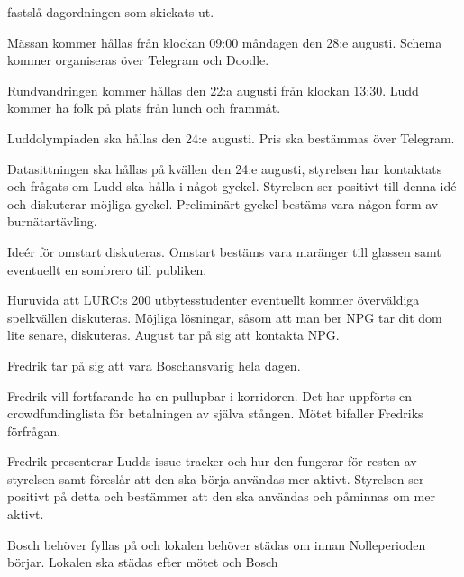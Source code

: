 \documentclass{protokoll}
\begin{document}
\newpage  


\begin{beslut}
     \att fastslå dagordningen som skickats ut.
\end{beslut}

Mässan kommer hållas från klockan 09:00 måndagen den 28:e augusti. Schema kommer organiseras över Telegram och Doodle.

Rundvandringen kommer hållas den 22:a augusti från klockan 13:30. Ludd kommer ha folk på plats från lunch och frammåt.

Luddolympiaden ska hållas den 24:e augusti. Pris ska bestämmas över Telegram.

Datasittningen ska hållas på kvällen den 24:e augusti, styrelsen har kontaktats och frågats om Ludd ska hålla i något gyckel. Styrelsen ser positivt till denna idé och diskuterar möjliga gyckel. Preliminärt gyckel bestäms vara någon form av burnätartävling.  

Ideér för omstart diskuteras. Omstart bestäms vara maränger till glassen samt eventuellt en sombrero till publiken.

Huruvida att LURC:s 200 utbytesstudenter eventuellt kommer överväldiga spelkvällen diskuteras. Möjliga lösningar, såsom att man ber NPG tar dit dom lite senare, diskuteras. August tar på sig att kontakta NPG.  

Fredrik tar på sig att vara Boschansvarig hela dagen.

Fredrik vill fortfarande ha en pullupbar i korridoren. Det har uppförts en crowdfundinglista för betalningen av själva stången. 
Mötet bifaller Fredriks förfrågan.

Fredrik presenterar Ludds issue tracker och hur den fungerar för resten av styrelsen samt föreslår att den ska börja användas mer aktivt. Styrelsen ser positivt på detta och bestämmer att den ska användas och påminnas om mer aktivt. 

Bosch behöver fyllas på och lokalen behöver städas om innan Nolleperioden börjar. Lokalen ska städas efter mötet och Bosch 
\end{document}
